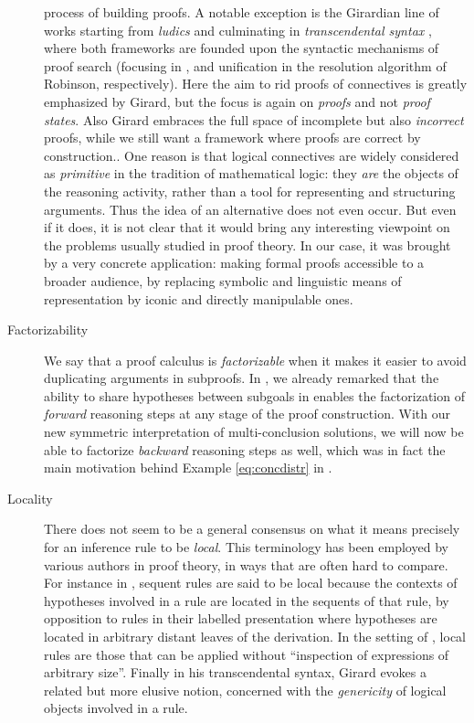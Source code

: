 \begin{description}
{    process of building proofs. A notable exception is the Girardian line of
    works starting from \emph{ludics} \cite{girard_locus_2001} and culminating
    in \emph{transcendental syntax} \cite{eng_exegesis_2023}, where both
    frameworks are founded upon the syntactic mechanisms of proof search
    (focusing in , and unification in the resolution algorithm
    of Robinson, respectively). Here the aim to rid proofs of connectives is
    greatly emphasized by Girard, but the focus is again on \emph{proofs} and
    not \emph{proof states}. Also Girard embraces the full space of incomplete
    but also \emph{incorrect} proofs, while we still want a framework where
    proofs are correct by construction.}. One reason is that logical connectives
    are widely considered as \emph{primitive} in the tradition of mathematical
    logic: they \emph{are} the objects of the reasoning activity, rather than a
    tool for representing and structuring arguments. Thus the idea of an
    alternative does not even occur. But even if it does, it is not clear that
    it would bring any interesting viewpoint on the problems usually studied in
    proof theory. In our case, it was brought by a very concrete application:
    making formal proofs accessible to a broader audience, by replacing symbolic
    and linguistic means of representation by iconic and directly manipulable
    ones.
  \item[Factorizability]
    We say that a proof calculus is \emph{factorizable} when it makes it easier
    to avoid duplicating arguments in subproofs. In , we
    already remarked that the ability to share hypotheses between subgoals in
     enables the factorization of \emph{forward} reasoning steps at any
    stage of the proof construction. With our new symmetric interpretation of
    multi-conclusion solutions, we will now be able to factorize \emph{backward}
    reasoning steps as well, which was in fact the main motivation behind
    Example \ref{eq:concdistr} in .
  \item[Locality]
    There does not seem to be a general consensus on what it means precisely for
    an inference rule to be \emph{local}. This terminology has been employed by
    various authors in proof theory, in ways that are often hard to compare. For
    instance in , sequent rules are said to be
    local because the contexts of hypotheses involved in a rule are located in
    the sequents of that rule, by opposition to  rules in their
    labelled presentation where hypotheses are located in arbitrary distant
    leaves of the derivation. In the setting of , local rules are
    those that can be applied without ``inspection of expressions of arbitrary
    size''. Finally in his transcendental
    syntax, Girard evokes a related but more elusive notion, concerned with the
    \emph{genericity} of logical objects involved in a rule.
    

\end{description}
